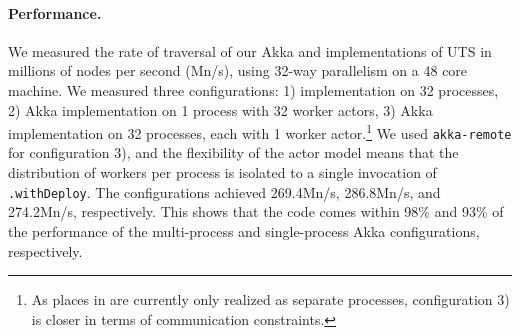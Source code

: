 
\paragraph{Performance.} We measured the rate of traversal of our Akka and
\apgas implementations of UTS in millions of nodes per second (Mn/s), using
32-way parallelism on a 48 core machine. We measured three configurations: 1)
\apgas implementation on 32 processes, 2) Akka implementation on 1 process with
32 worker actors, 3) Akka implementation on 32 processes, each with 1 worker
actor.\footnote{As places in \apgas are currently only realized as separate
processes, configuration 3) is closer in terms of communication constraints.}
We used \lstinline{akka-remote} for configuration 3), and the flexibility of
the actor model means that the distribution of workers per process is isolated
to a single invocation of \lstinline{.withDeploy}. The configurations achieved
269.4Mn/s, 286.8Mn/s, and 274.2Mn/s, respectively. This shows that the \apgas
code comes within 98\% and 93\% of the performance of the multi-process and
single-process Akka configurations, respectively.







